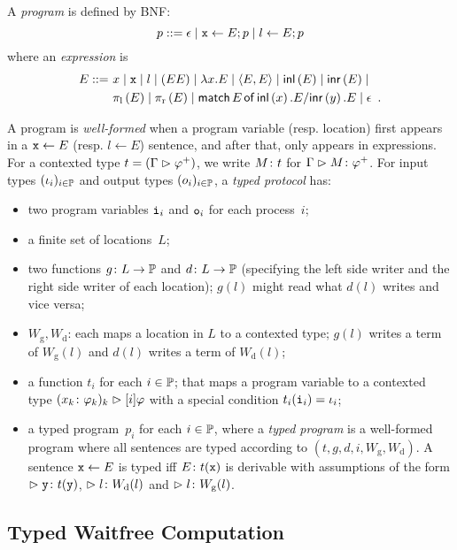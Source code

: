 A \textit{program} is defined by BNF:
\[
 p ::= \epsilon\mid
 \texttt{x}\leftarrow E; p \mid
 l \leftarrow E; p
\]
where an \textit{expression} is
\begin{align*}
 E
 ::=\,\,
 &x\mid \texttt{x} \mid l \mid (EE)\mid \lambda
 x.E\mid \langle{E,E}\rangle\mid \mathsf{inl}\left({E}\right)\mid \mathsf{inr}\left({E}\right)\mid \\
 &\pi_{\mathrm l}\left({E}\right)\mid\pi_{\mathrm r}\left({E}\right)\mid  \mathsf{match}\,{E}\,\mathsf{of}\, \mathsf{inl}\left({x}\right). {E}/ \mathsf{inr}\left({y}\right). {E}\mid \epsilon\enspace.
\end{align*}

\newcommand{\Wg}{W_{\mathrm g}}
\newcommand{\Wd}{W_{\mathrm d}}
A program is \textit{well-formed} when
a program variable (resp. location) first appears in a $\texttt{x}\leftarrow E$
(resp. $l\leftarrow E$)
sentence, and
after that, only appears in expressions.
For a contexted type $t = (\Gamma\vartriangleright{\varphi}^+)$,
we write ${M} \colon{t}$ for
$\Gamma\vartriangleright{M} \colon{{\varphi}^+}$.
For input types $(\iota_i)_{i\in\mathbb{P}}$
and output types $(o_i)_{i\in\mathbb{P}}$, 
a \textit{typed protocol} has:
\begin{itemize}
 \item two program variables
      $\texttt{i}_i$ and $\texttt{o}_i$ for each process~$i$;
 \item a finite set of locations~$L$;
 \item two functions $g\colon L\rightarrow \mathbb{P}$
       and $d\colon L\rightarrow
       \mathbb{P}$ (specifying the left side writer and the right side writer of
       each location);
       $g(l)$ might read what $d(l)$ writes and vice versa;
 \item $\Wg, \Wd$: each maps a location in $L$ to a contexted type;
       $g(l)$ writes a term of $\Wg(l)$ and $d(l)$ writes a term of $\Wd(l)$;
 \item a function $t_i$ for each $i\in \mathbb{P}$;
       that maps a program variable to a contexted type
       $({x_k} \colon{\varphi_k})_k \vartriangleright[i]\varphi$ with a special condition
       $t_i(\texttt{i}_i)= \iota_i$;
 \item a typed program~$p_i$ for each $i\in \mathbb{P}$,
       where
a \textit{typed program} is a well-formed program where all
sentences are typed according to $(t,g,d,i,\Wg, \Wd)$.
A sentence $\texttt{x} \leftarrow E$ is typed  iff $E\colon t(\texttt{x})$ is derivable with
assumptions of the form $\vartriangleright{\texttt{y}} \colon{t(\texttt{y})}$,\quad
$\vartriangleright{l} \colon{W_{\mathrm d}}(l)$ and
$\vartriangleright{l} \colon{W_{\mathrm g}}(l)$.
\end{itemize}

\subsection{Typed Waitfree Computation}

